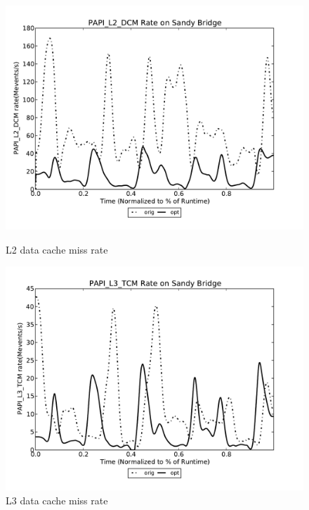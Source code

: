 \begin{figure}
\centering
\begin{minipage}{1.\textwidth}
   \begin{center}
   \includegraphics[width=1.\linewidth,height=.29\textheight]{figures/perfTestWACCM-PAPI_L2_DCM.pdf}
   \caption{L2 data cache miss rate}
   \label{fig:perfTestWACCM-L2}
   \end{center}
\end{minipage}
\begin{minipage}{1.\textwidth}
   \begin{center}
   \includegraphics[width=1.\linewidth,height=.29\textheight]{figures/perfTestWACCM-PAPI_L3_TCM.pdf}
   \caption{L3 data cache miss rate}

\end{center}
\end{minipage}
\end{figure}
